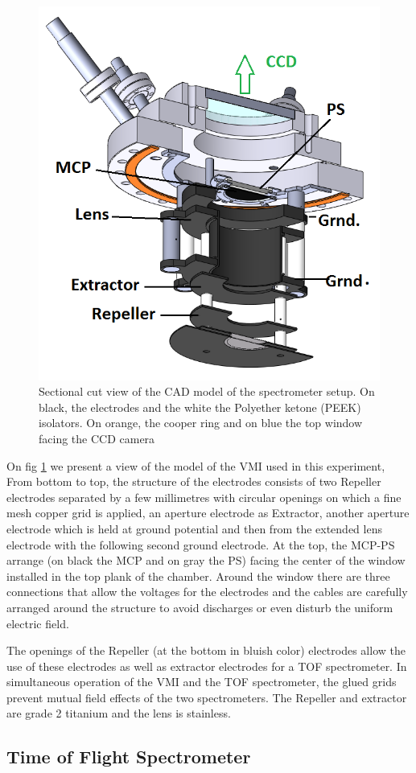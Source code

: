\begin{figure}[hbtp]
\label{img:mcp cut}
\centering
\includegraphics[width =8 cm]{../Images/MCP cut.png}
\caption[MCP sketch cut]{Sectional cut view of the CAD model of the spectrometer setup. On black, the electrodes and the white the Polyether ketone (PEEK) isolators. On orange, the cooper ring and on blue the top window facing the CCD camera
}
\end{figure}

On fig \ref{img:mcp cut} we present a view of the model of the VMI used in this experiment, From bottom to top, the structure of the electrodes consists of two Repeller electrodes separated by a few millimetres with circular openings on which a fine mesh copper grid is applied, an aperture electrode as Extractor, another aperture electrode which is held at ground potential and then from the extended lens electrode with the following second ground electrode. At the top, the MCP-PS arrange (on black the MCP and on gray the PS) facing the center of the window installed in the top plank of the chamber. Around the window there are three connections that allow the voltages for the electrodes and the cables are carefully arranged around the structure to avoid discharges or even disturb the uniform electric field.

The openings of the Repeller (at the bottom in bluish color) electrodes allow the use of these electrodes as well as extractor electrodes for a TOF spectrometer. In simultaneous operation of the VMI and the TOF spectrometer, the glued grids prevent mutual field effects of the two spectrometers.  The Repeller and extractor are grade 2 titanium and the lens is stainless.

\subsection{Time of Flight Spectrometer}

